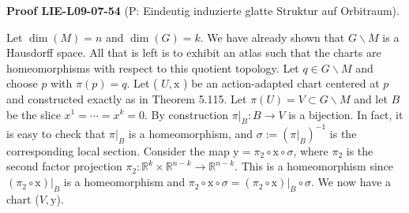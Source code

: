 \documentclass[10pt, letterpaper]{article}
\newcommand{\CustomHeading}[3]{%
  \par\medskip\noindent%
  \textbf{#1 #2} \textnormal{(#3)}.\enskip%
}
\newenvironment{PROOF}[2]{\CustomHeading{Proof}{#1}{#2}}{}
\begin{document}
\begin{PROOF}{LIE-L09-07-54}{P: Eindeutig induzierte glatte Struktur auf Orbitraum}
Let $\operatorname{dim}(M)=n$ and $\operatorname{dim}(G)=k$. We have already shown that $G \backslash M$ is a Hausdorff space. All that is left is to exhibit an atlas such that the charts are homeomorphisms with respect to this quotient topology. Let $q \in G \backslash M$ and choose $p$ with $\pi(p)=q$. Let ( $U, \mathrm{x}$ ) be an action-adapted chart centered at $p$ and constructed exactly as in Theorem 5.115. Let $\pi(U)=V \subset G \backslash M$ and let $B$ be the slice $x^{1}=\cdots=x^{k}=0$. By construction $\left.\pi\right|_{B}: B \rightarrow V$ is a bijection. In fact, it is easy to check that $\left.\pi\right|_{B}$ is a homeomorphism, and $\sigma:=\left(\left.\pi\right|_{B}\right)^{-1}$ is the corresponding local section. Consider the map $\mathrm{y}=\pi_{2} \circ \mathrm{x} \circ \sigma$, where $\pi_{2}$ is the second factor projection $\pi_{2}: \mathbb{R}^{k} \times \mathbb{R}^{n-k} \rightarrow \mathbb{R}^{n-k}$. This is a homeomorphism since $\left.\left(\pi_{2} \circ \mathrm{x}\right)\right|_{B}$ is a homeomorphism and $\pi_{2} \circ \mathrm{x} \circ \sigma=\left.\left(\pi_{2} \circ \mathrm{x}\right)\right|_{B} \circ \sigma$. We now have a chart ($V, \mathrm{y}$).


\end{PROOF}
\end{document}
